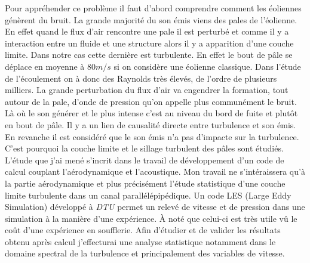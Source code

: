 \documentclass[12pt]{article}
\theoremstyle{plain}
\theoremstyle{remark}
\begin{document}
	Pour appréhender ce problème il faut d'abord comprendre comment les éoliennes génèrent du bruit. La grande majorité du son émis viens des pales de l'éolienne. En effet quand le flux d'air rencontre une pale il est perturbé et comme il y a interaction entre un fluide et une structure alors il y a apparition d'une couche limite. Dans notre cas cette dernière est turbulente. En effet le bout de pâle se déplace en moyenne à $80 m/s$ si on considère une éolienne classique. Dans l'étude de l'écoulement on à donc des Raynolds très élevés, de l'ordre de plusieurs milliers. La grande perturbation du flux d'air va engendrer la formation, tout autour de la pale, d'onde de pression qu'on appelle plus communément le bruit. Là où le son générer et le plus intense c'est au niveau du bord de fuite et plutôt en bout de pâle. Il y a un lien de causalité directe entre turbulence et son émis. En revanche il est considéré que le son émis n'a pas d'impacte sur la turbulence. C'est pourquoi la couche limite et le sillage turbulent des pâles sont étudiés.\\
	
	L'étude que j'ai mené s'incrit dans le travail de développement d'un code de calcul couplant l'aérodynamique et l'acoustique. Mon travail ne s'intéraissera qu'à la partie aérodynamique et plus précisément l'étude statistique d'une couche limite turbulente dans un canal parallélépipédique. Un code LES (Large Eddy Simulation) développé à \textit{DTU} permet un relevé de vitesse et de pression dans une simulation à la manière d'une expérience. À noté que celui-ci est très utile vû le coût d'une expérience en soufflerie. Afin d'étudier et de valider les résultats obtenu après calcul j'effecturai une analyse statistique notamment dans le domaine spectral de la turbulence et principalement des variables de vitesse. \\
	
\end{document}
